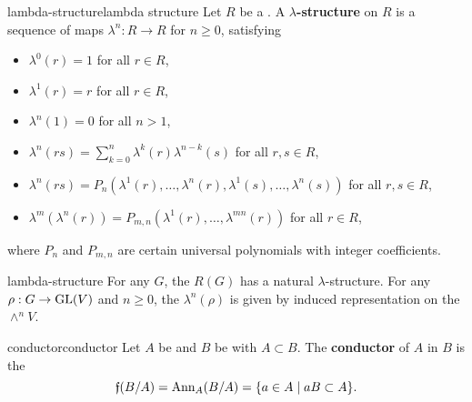 \begin{topic}{lambda-structure}{lambda structure}
    Let $R$ be a . A \textbf{$\lambda$-structure} on $R$ is a sequence of maps $\lambda^n : R \to R$ for $n \ge 0$, satisfying
    \begin{itemize}
        \item $\lambda^0(r) = 1$ for all $r \in R$,
        \item $\lambda^1(r) = r$ for all $r \in R$,
        \item $\lambda^n(1) = 0$ for all $n > 1$,
        \item $\lambda^{n}(rs) = \sum_{k = 0}^{n} \lambda^k(r) \lambda^{n - k}(s)$ for all $r, s \in R$,
        \item $\lambda^n(rs) = P_n(\lambda^1(r), \ldots, \lambda^n(r), \lambda^1(s), \ldots,  \lambda^n(s))$ for all $r, s \in R$,
        \item $\lambda^m(\lambda^n(r)) = P_{m, n}(\lambda^1(r), \ldots, \lambda^{mn}(r))$ for all $r \in R$,
    \end{itemize}
    where $P_n$ and $P_{m, n}$ are certain universal polynomials with integer coefficients.
\end{topic}

\begin{example}{lambda-structure}
    For any  $G$, the  $R(G)$ has a natural $\lambda$-structure. For any  $\rho : G \to \textup{GL}(V)$ and $n \ge 0$, the $\lambda^n(\rho)$ is given by induced representation on the  $\wedge^n V$.
\end{example}

\begin{topic}{conductor}{conductor}
    Let $A$ be and $B$ be  with $A \subset B$. The \textbf{conductor} of $A$ in $B$ is the 
    \[ \mathfrak{f}(B/A) = \textup{Ann}_A(B/A) = \{ a \in A \;|\; a B \subset A \} . \]
\end{topic}
